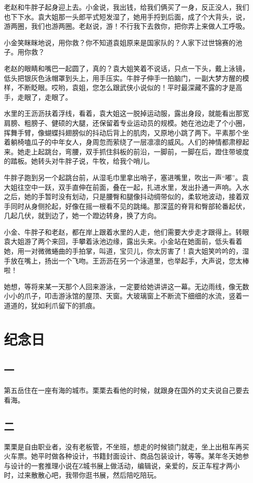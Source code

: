 \documentclass[lang=cn,newtx,12pt,scheme=chinese]{elegantbook}
\begin{document}
老赵和牛胖子起身迎上去。小金说，我出钱，给我们俩买了一身，反正没人，我们也下下水。袁大姐那一头郎平式短发湿了，她用手捋到后面，成了个大背头，说，游两圈，我们也游两圈。老赵说，游！不行我下去救你，把你弄上来做人工呼吸。

小金笑眯眯地说，用你救？你不知道袁姐原来是国家队的？人家下过世锦赛的池子。用你救？

老赵的眼睛和嘴巴一起圆了，真的？袁大姐笑着不说话，只点一下头，戴上泳镜，低头把银灰色泳帽罩到头上，用手压实。牛胖子伸手一拍脑门，一副大梦方醒的模样，不断眨眼。哎哟，袁姐，您怎么跟武侠小说似的！平时最深藏不露的才是高手，走眼了，走眼了。

水里的王沥沥扶着浮线，看着，袁大姐这一脱掉运动服，露出身段，就能看出那宽肩膀、粗膀子、健硕的大腿，还保留着专业运动员的规模。她在池边走了个小圈，挥舞手臂，像蝴蝶抖翅膀似的抖动后背上的肌肉，又原地小跳了两下。平素那个坐着躺椅嗑瓜子的中年女人，身周忽而萦绕了一层凛凛的威风。人们的神情都肃穆起来。她走上起跳台，弯腰，双手抓住斜板的前沿，一脚前，一脚在后，蹬住带坡度的踏板。她转头对牛胖子说，牛牧，给我个哨儿。

牛胖子跑到另一个起跳台前，从湿毛巾里拿出哨子，塞进嘴里，吹出一声“嘟”。袁大姐往空中一跃，双手直伸在前面，叠在一起，扎进水里，发出扑通一声响。入水之后，她的手暂时没有划动，只是腰臀和腿像抖动绸带似的，柔软地波动，接着双手同时从身侧抡起，好像在摇一根看不见的跳绳。那深蓝的脊背和臀部轮番起伏，几起几伏，就到边了，她一个蹬边转身，换了方向。

小金、牛胖子和老赵，都在岸上跟着水里的人走，他们需要大步走才跟得上。转眼袁大姐游了两个来回，手攀着泳池边缘，露出头来。小金站在她面前，低头看着她，用一对微微蜷曲的手拍掌，叫道，宝贝儿，你太厉害了！袁大姐笑吟吟的，湿手放在嘴上，扬出一个飞吻。王沥沥在另一个泳道里，也举起手，大声说，您太棒啦！

她想，等将来某一天那个人回来游泳，一定要给她讲讲这一幕。无边雨线，像无数小小的爪子，叩击游泳馆的屋顶、天窗。大玻璃窗上不断流下细细的水流，竖着一道道的，犹如利爪留下的抓痕。
\chapter{纪念日}
\section{一}
第五岳住在一座有海的城市。栗栗去看他的时候，就跟身在国外的丈夫说自己要去看海。
\section{二}
栗栗是自由职业者，没有老板管，不坐班，想走的时候锁门就走，坐上出租车再买火车票。她平时做各种设计，书籍封面设计、商品包装设计，等等。某年冬天她参与设计的一套推理小说在Z城书展上做活动，编辑说，亲爱的，反正车程才两小时，过来散散心吧，我带你逛书展，然后陪吃陪玩。
\end{document}
